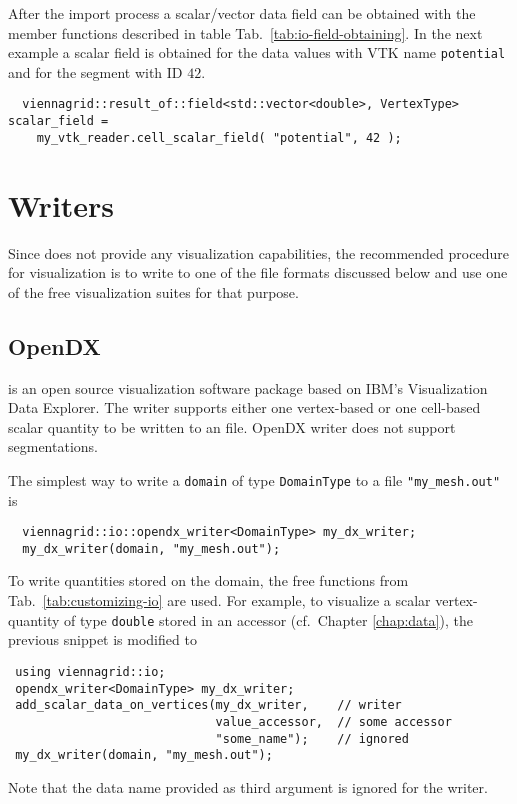  After the import process a scalar/vector data field can be obtained with the member functions described in table Tab.~\ref{tab:io-field-obtaining}. In the next example a scalar field is obtained for the data values with VTK name \texttt{potential} and for the segment with ID $42$.
 
 \begin{lstlisting}
  viennagrid::result_of::field<std::vector<double>, VertexType> scalar_field =
    my_vtk_reader.cell_scalar_field( "potential", 42 );
 \end{lstlisting}
 
 
 
\section{Writers}
Since {\ViennaGrid} does not provide any visualization capabilities, the recommended procedure for visualization is 
to write to one of the file formats discussed below and use one of the free visualization suites for that purpose.


 \subsection{OpenDX}
 {\OpenDX} \cite{opendx} is an open source visualization software package based on IBM's Visualization Data Explorer.
 The writer supports either one vertex-based or one cell-based scalar quantity to be written to an {\OpenDX} file. OpenDX writer does not support segmentations.

 The simplest way to write a \lstinline|domain| of type \lstinline|DomainType| to a file \lstinline|"my_mesh.out"| is
 \begin{lstlisting}
  viennagrid::io::opendx_writer<DomainType> my_dx_writer;
  my_dx_writer(domain, "my_mesh.out");
 \end{lstlisting}
 To write quantities stored on the domain, the free functions from Tab.~\ref{tab:customizing-io} are used.
 For example, to visualize a scalar vertex-quantity of type \lstinline|double| stored in an accessor (cf.~Chapter \ref{chap:data}), the previous snippet is modified to
 \begin{lstlisting}
 using viennagrid::io;
 opendx_writer<DomainType> my_dx_writer;
 add_scalar_data_on_vertices(my_dx_writer,    // writer
                             value_accessor,  // some accessor
                             "some_name");    // ignored
 my_dx_writer(domain, "my_mesh.out");
 \end{lstlisting}
 Note that the data name provided as third argument is ignored for the {\OpenDX} writer.

